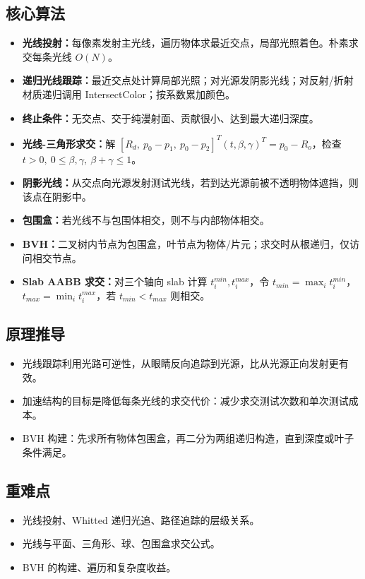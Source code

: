 \documentclass[UTF8,fontset=fandol,11pt]{ctexart}
\newcommand{\key}[1]{\textbf{#1}}
\begin{document}
\subsection{核心算法}
\begin{itemize}
  \item \key{光线投射：}每像素发射主光线，遍历物体求最近交点，局部光照着色。朴素求交每条光线 $O(N)$。
  \item \key{递归光线跟踪：}最近交点处计算局部光照；对光源发阴影光线；对反射/折射材质递归调用 IntersectColor；按系数累加颜色。
  \item \key{终止条件：}无交点、交于纯漫射面、贡献很小、达到最大递归深度。
  \item \key{光线-三角形求交：}解 $[R_d,\ p_0-p_1,\ p_0-p_2]^T(t,\beta,\gamma)^T=p_0-R_o$，检查 $t>0,\ 0\le\beta,\gamma,\ \beta+\gamma\le1$。
  \item \key{阴影光线：}从交点向光源发射测试光线，若到达光源前被不透明物体遮挡，则该点在阴影中。
  \item \key{包围盒：}若光线不与包围体相交，则不与内部物体相交。
  \item \key{BVH：}二叉树内节点为包围盒，叶节点为物体/片元；求交时从根递归，仅访问相交节点。
  \item \key{Slab AABB 求交：}对三个轴向 slab 计算 $t_i^{min},t_i^{max}$，令 $t_{min}=\max_i t_i^{min}$，$t_{max}=\min_i t_i^{max}$，若 $t_{min}<t_{max}$ 则相交。
\end{itemize}
\subsection{原理推导}
\begin{itemize}
  \item 光线跟踪利用光路可逆性，从眼睛反向追踪到光源，比从光源正向发射更有效。
  \item 加速结构的目标是降低每条光线的求交代价：减少求交测试次数和单次测试成本。
  \item BVH 构建：先求所有物体包围盒，再二分为两组递归构造，直到深度或叶子条件满足。
\end{itemize}
\subsection{重难点}
\begin{itemize}
  \item 光线投射、Whitted 递归光追、路径追踪的层级关系。
  \item 光线与平面、三角形、球、包围盒求交公式。
  \item BVH 的构建、遍历和复杂度收益。
\end{itemize}
\end{document}
